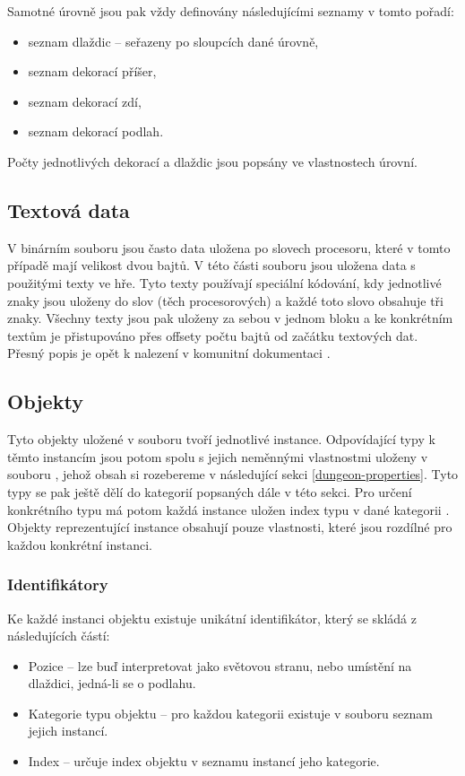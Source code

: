 Samotné úrovně jsou pak vždy definovány následujícími seznamy v tomto pořadí:
\begin{itemize}
\item seznam dlaždic -- seřazeny po sloupcích dané úrovně,
\item seznam dekorací příšer,
\item seznam dekorací zdí, 
\item seznam dekorací podlah.
\end{itemize}
Počty jednotlivých dekorací a dlaždic jsou popsány ve vlastnostech úrovní.

\subsection{Textová data}

V binárním souboru jsou často data uložena po slovech procesoru, které v tomto případě mají velikost dvou bajtů. 
V této části souboru jsou uložena data s použitými texty ve hře. Tyto texty používají speciální kódování,
kdy jednotlivé znaky jsou uloženy do slov  (těch procesorových) a každé toto slovo obsahuje tři znaky. Všechny 
texty jsou pak uloženy za sebou v jednom bloku a ke konkrétním textům je přistupováno přes offsety počtu bajtů
od začátku textových dat. Přesný popis je opět k nalezení v komunitní dokumentaci \cite{TechnicalDocumentationFontanel05}.

\subsection{Objekty}

Tyto objekty uložené v souboru  tvoří jednotlivé instance. Odpovídající typy
k těmto instancím jsou potom spolu s jejich neměnnými vlastnostmi uloženy v souboru ,
jehož obsah si rozebereme v následující sekci \ref{dungeon-properties}. Tyto typy se pak ještě dělí do kategorií popsaných dále v této sekci.
Pro určení konkrétního typu má potom každá instance uložen index typu v dané kategorii .
Objekty reprezentující instance obsahují pouze vlastnosti, které jsou rozdílné pro každou konkrétní instanci.


\subsubsection{Identifikátory}

Ke každé instanci objektu existuje unikátní identifikátor, který se skládá z následujících částí:
\begin{itemize}
\item Pozice -- lze buď interpretovat jako světovou stranu, nebo 
	umístění na dlaždici, jedná-li se o podlahu.
\item Kategorie typu objektu -- pro každou kategorii existuje
	v souboru  seznam jejich instancí.
\item Index -- určuje index objektu v seznamu instancí jeho kategorie.
\end{itemize}

